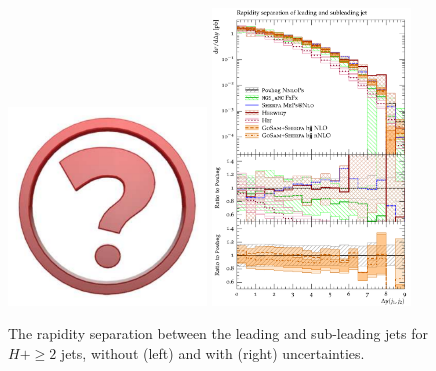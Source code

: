 \begin{figure}[t!]
  \centering
  \includegraphics[width=0.47\textwidth]{Micon.pdf}
  \hfill
  \includegraphics[width=0.47\textwidth]{figures/hjetscomp_deltay_jj.pdf}
  \caption{
    The rapidity separation between the leading and sub-leading jets
    for $H+\ge2$ jets, without (left) and with (right) uncertainties.
    \label{fig:higgscomp:results:2obs:dyjj}
  }
\end{figure}

